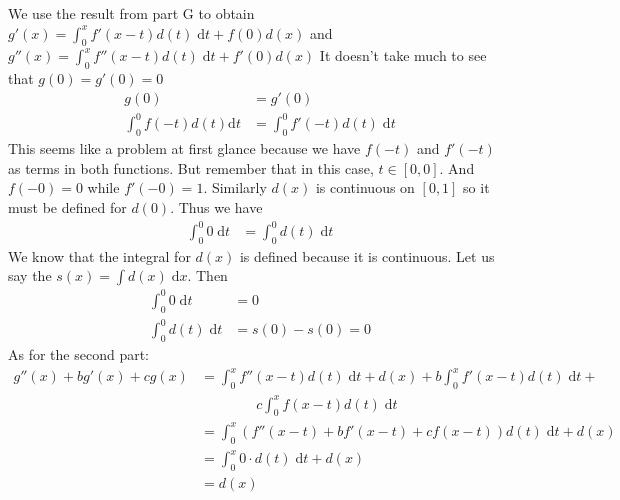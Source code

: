 \documentclass[letterpaper]{article}
\begin{document}
\begin{enumerate}
We use the result from part G to obtain $g'(x)=\int_0^x{f'(x-t)d(t)\;\mathrm{d}t}+f(0)d(x)$ and $g''(x)=\int_0^x{f''(x-t)d(t)\;\mathrm{d}t}+f'(0)d(x)$
It doesn't take much to see that $g(0)=g'(0)=0$
\begin{align*}
  g(0)&=g'(0)\\
  \int_0^0{f(-t)d(t)\mathrm{d}t}&=\int_0^0{f'(-t)d(t)\;\mathrm{d}t}
\end{align*}
This seems like a problem at first glance because we have $f(-t)$ and $f'(-t)$ as terms in both functions. But remember that in this case, $t\in [0,0]$. And $f(-0)=0$ while $f'(-0)=1$. Similarly $d(x)$ is continuous on $[0,1]$ so it must be defined for $d(0)$. Thus we have
\begin{align*}
   \int_0^0{0\;\mathrm{d}t}&=\int_0^0{d(t)\;\mathrm{d}t} 
\end{align*}
We know that the integral for $d(x)$ is defined because it is continuous. Let us say the $s(x)=\int{d(x)\;\mathrm{d}x}$. Then 
\begin{align*}
   \int_0^0{0\;\mathrm{d}t}&=0\\
   \int_0^0{d(t)\;\mathrm{d}t} &=s(0)-s(0)=0
\end{align*}
As for the second part:
\begin{align*}
  g''(x)+bg'(x)+cg(x)&=\int_0^x{f''(x-t)d(t)\;\mathrm{d}t}+d(x)+b\int_0^x{f'(x-t)d(t)\;\mathrm{d}t}+\\&\qquad\qquad c\int_0^x{f(x-t)d(t)\;\mathrm{d}t}\\
  &=\int_0^x{(f''(x-t)+bf'(x-t)+cf(x-t))d(t)\;\mathrm{d}t}+d(x)\\
  &=\int_0^x{0\cdot d(t)\;\mathrm{d}t}+d(x)\\
  &=d(x)
\end{align*}
\end{enumerate}
\end{document}
